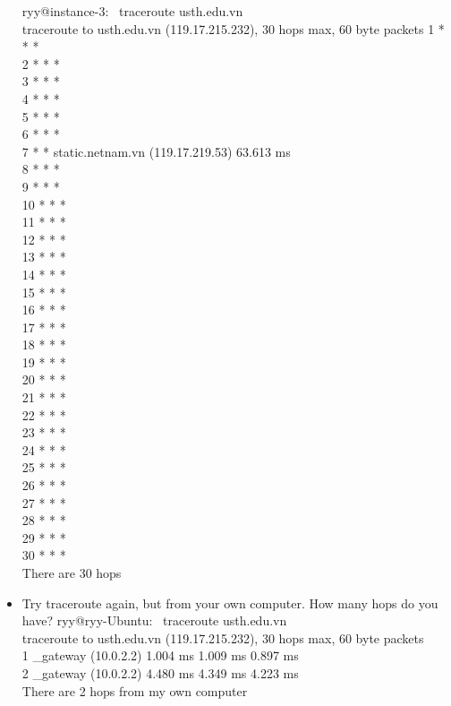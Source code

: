 \documentclass{article}
\begin{document}
\begin{itemize}
ryy@instance-3:~ traceroute usth.edu.vn\\
traceroute to usth.edu.vn (119.17.215.232), 30 hops max, 60 byte packets
 1  * * * \\
 2  * * *\\
 3  * * *\\
 4  * * *\\
 5  * * *\\
 6  * * *\\
 7  * * static.netnam.vn (119.17.219.53)  63.613 ms\\
 8  * * *\\
 9  * * *\\
10  * * *\\
11  * * *\\
12  * * *\\
13  * * *\\
14  * * *\\
15  * * *\\
16  * * *\\
17  * * *\\
18  * * *\\
19  * * *\\
20  * * *\\
21  * * *\\
22  * * *\\
23  * * *\\
24  * * *\\
25  * * *\\
26  * * *\\
27  * * *\\
28  * * *\\
29  * * *\\
30  * * *\\
There are 30 hops
\item Try traceroute again, but from your own computer. How many hops do you have?
ryy@ryy-Ubuntu:~ traceroute usth.edu.vn \\
traceroute to usth.edu.vn (119.17.215.232), 30 hops max, 60 byte packets\\
 1  _gateway (10.0.2.2)  1.004 ms  1.009 ms  0.897 ms\\
 2  _gateway (10.0.2.2)  4.480 ms  4.349 ms  4.223 ms\\
There are 2 hops from my own computer
    \end{itemize}
\end{document}
